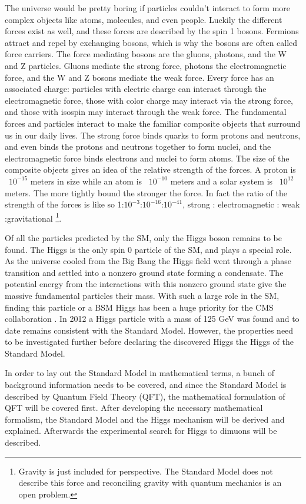 The universe would be pretty boring if particles couldn't interact to form more complex objects like atoms, molecules, and even people. Luckily the different forces exist as well, and these forces are described by the spin 1 bosons. Fermions attract and repel by exchanging bosons, which is why the bosons are often called force carriers. The force mediating bosons are the gluons, photons, and the W and Z particles. Gluons mediate the strong force, photons the electromagnetic force, and the W and Z bosons mediate the weak force. Every force has an associated charge: particles with electric charge can interact through the electromagnetic force, those with color charge may interact via the strong force, and those with isospin may interact through the weak force. The fundamental forces and particles interact to make the familiar composite objects that surround us in our daily lives. The strong force binds quarks to form protons and neutrons, and even binds the protons and neutrons together to form nuclei, and the electromagnetic force binds electrons and nuclei to form atoms. The size of the composite objects gives an idea of the relative strength of the forces. A proton is ~$10^{-15}$ meters in size while an atom is ~$10^{-10}$ meters and a solar system is ~$10^{12}$ meters. The more tightly bound the stronger the force. In fact the ratio of the strength of the forces is like so 1:$10^{-3}$:$10^{-16}$:$10^{-41}$, strong : electromagnetic : weak :gravitational \footnote{Gravity is just included for perspective. The Standard Model does not describe this force and reconciling gravity with quantum mechanics is an open problem.}. 

Of all the particles predicted by the SM, only the Higgs boson remains to be found. The Higgs is the only spin 0 particle of the SM, and plays a special role. As the universe cooled from the Big Bang the Higgs field went through a phase transition and settled into a nonzero ground state forming a condensate. The potential energy from the interactions with this nonzero ground state give the massive fundamental particles their mass. With such a large role in the SM, finding this particle or a BSM Higgs has been a huge priority for the CMS collaboration \cite{tdr}. In 2012 a Higgs particle with a mass of 125 GeV was found and to date remains consistent with the Standard Model. However, the properties need to be investigated further before declaring the discovered Higgs the Higgs of the Standard Model. 

In order to lay out the Standard Model in mathematical terms, a bunch of background information needs to be covered, and since the Standard Model is described by Quantum Field Theory (QFT), the mathematical formulation of QFT will be covered first. After developing the necessary mathematical formalism, the Standard Model and the Higgs mechanism will be derived and explained. Afterwards the experimental search for Higgs to dimuons will be described.

